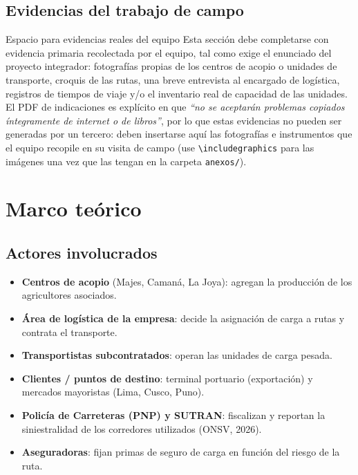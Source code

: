 \documentclass[11pt,a4paper]{article}
\begin{document}
\subsection{Evidencias del trabajo de campo}
\label{sec:evidencias}
\begin{evidencia}{Espacio para evidencias reales del equipo}
Esta secci\'on debe completarse con evidencia primaria recolectada por el equipo, tal como exige el enunciado del proyecto integrador: fotograf\'ias propias de los centros de acopio o unidades de transporte, croquis de las rutas, una breve entrevista al encargado de log\'istica, registros de tiempos de viaje y/o el inventario real de capacidad de las unidades. El PDF de indicaciones es expl\'icito en que \emph{``no se aceptar\'an problemas copiados \'integramente de internet o de libros''}, por lo que estas evidencias no pueden ser generadas por un tercero: deben insertarse aqu\'i las fotograf\'ias e instrumentos que el equipo recopile en su visita de campo (use \verb|\includegraphics| para las im\'agenes una vez que las tengan en la carpeta \texttt{anexos/}).
\end{evidencia}

\section{Marco te\'orico}

\subsection{Actores involucrados}
\begin{itemize}
  \item \textbf{Centros de acopio} (Majes, Caman\'a, La Joya): agregan la producci\'on de los agricultores asociados.
  \item \textbf{\'Area de log\'istica de la empresa}: decide la asignaci\'on de carga a rutas y contrata el transporte.
  \item \textbf{Transportistas subcontratados}: operan las unidades de carga pesada.
  \item \textbf{Clientes / puntos de destino}: terminal portuario (exportaci\'on) y mercados mayoristas (Lima, Cusco, Puno).
  \item \textbf{Polic\'ia de Carreteras (PNP) y SUTRAN}: fiscalizan y reportan la siniestralidad de los corredores utilizados (ONSV, 2026).
  \item \textbf{Aseguradoras}: fijan primas de seguro de carga en funci\'on del riesgo de la ruta.
\end{itemize}
\end{document}
